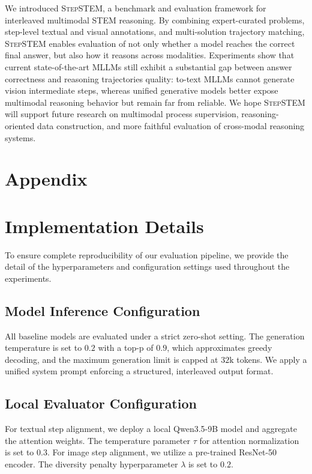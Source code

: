 \documentclass[11pt]{article}
\newcommand{\bench}{{\textsc{StepSTEM}}}
\begin{document}
We introduced {\bench}, a benchmark and evaluation framework for interleaved multimodal STEM reasoning. By combining expert-curated problems, step-level textual and visual annotations, and multi-solution trajectory matching, {\bench} enables evaluation of not only whether a model reaches the correct final answer, but also how it reasons across modalities. Experiments show that current state-of-the-art MLLMs still exhibit a substantial gap between answer correctness and reasoning trajectories quality: to-text MLLMs cannot generate vision intermediate steps, whereas unified generative models better expose multimodal reasoning behavior but remain far from reliable. We hope {\bench} will support future research on multimodal process supervision, reasoning-oriented data construction, and more faithful evaluation of cross-modal reasoning systems.




\appendix
\section*{Appendix}
\section{Implementation Details}
\label{sec:imp_details}

To ensure complete reproducibility of our evaluation pipeline, we provide the detail of the hyperparameters and configuration settings used throughout the experiments.

\subsection{Model Inference Configuration}

All baseline models are evaluated under a strict zero-shot setting. The generation temperature is set to $0.2$ with a top-p of $0.9$, which approximates greedy decoding, and the maximum generation limit is capped at $32\text{k}$ tokens. We apply a unified system prompt enforcing a structured, interleaved output format.

\subsection{Local Evaluator Configuration}

For textual step alignment, we deploy a local Qwen3.5-9B model and aggregate the attention weights. The temperature parameter $\tau$ for attention normalization is set to $0.3$. For image step alignment, we utilize a pre-trained ResNet-50~\cite{DBLP:conf/cvpr/HeZRS16} encoder. The diversity penalty hyperparameter $\lambda$ is set to $0.2$.
\end{document}
